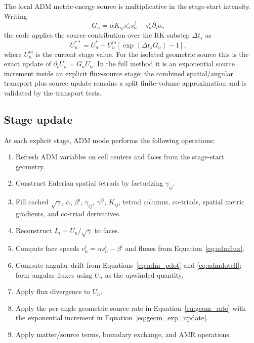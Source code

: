 \documentclass[11pt]{article}
\newcommand{\I}{I}
\begin{document}
The local ADM metric-energy source is multiplicative in the stage-start
intensity.  Writing
\begin{equation}
  G_n = \alpha K_{ij}s_n^i s_n^j - s_n^i\partial_i\alpha ,
  \label{eq:geom_rate}
\end{equation}
the code applies the source contribution over the RK substep \(\Delta t_s\) as
\begin{equation}
  U_n^{**}
  =
  U_n^{*}
  + U_n^m\left[\exp(\Delta t_s G_n)-1\right],
  \label{eq:geom_exp_update}
\end{equation}
where \(U_n^m\) is the current stage value.  For the isolated geometric source
this is the exact update of \(\partial_t U_n=G_n U_n\).  In the full method it
is an exponential source increment inside an explicit flux-source stage; the
combined spatial/angular transport plus source update remains a split
finite-volume approximation and is validated by the transport tests.

\subsection{Stage update}

At each explicit stage, ADM mode performs the following operations:
\begin{enumerate}
  \item Refresh ADM variables on cell centers and faces from the stage-start
        geometry.
  \item Construct Eulerian spatial tetrads by factorizing \(\gamma_{ij}\).
  \item Fill cached \(\sqrt{\gamma}\), \(\alpha\), \(\beta^i\),
        \(\gamma_{ij}\), \(\gamma^{ij}\), \(K_{ij}\), tetrad columns,
        co-triads, spatial metric gradients, and co-triad derivatives.
  \item Reconstruct \(\I_n=U_n/\sqrt{\gamma}\) to faces.
  \item Compute face speeds \(v^i_n=\alpha s^i_n-\beta^i\) and fluxes from
        Equation~\eqref{eq:admflux}.
  \item Compute angular drift from Equations~\eqref{eq:adm_pdot} and
        \eqref{eq:admdotell}; form angular fluxes using \(U_n\) as the
        upwinded quantity.
  \item Apply flux divergence to \(U_n\).
  \item Apply the per-angle geometric source rate in
        Equation~\eqref{eq:geom_rate} with the exponential increment in
        Equation~\eqref{eq:geom_exp_update}.
  \item Apply matter/source terms, boundary exchange, and AMR operations.
\end{enumerate}
\end{document}
